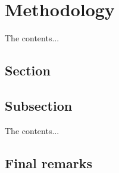 %
%

\chapter{Methodology} %
\label{chap:methodology}

The contents...

\section{Section}
\label{sec:meth:section}

\section{Subsection}
The contents...

%
%

\section{Final remarks}